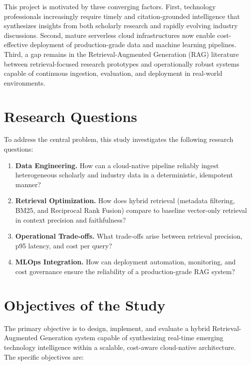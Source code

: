 This project is motivated by three converging factors. First, technology professionals increasingly require timely and citation-grounded intelligence that synthesizes insights from both scholarly research and rapidly evolving industry discussions. Second, mature serverless cloud infrastructures now enable cost-effective deployment of production-grade data and machine learning pipelines. Third, a gap remains in the Retrieval-Augmented Generation (RAG) literature between retrieval-focused research prototypes and operationally robust systems capable of continuous ingestion, evaluation, and deployment in real-world environments.

\section{Research Questions}
\label{sec:rq}

To address the central problem, this study investigates the following research questions:

\begin{enumerate}[leftmargin=0.5in]
  \item \textbf{Data Engineering.} How can a cloud-native pipeline reliably ingest heterogeneous scholarly and industry data in a deterministic, idempotent manner?

  \item \textbf{Retrieval Optimization.} How does hybrid retrieval (metadata filtering, BM25, and Reciprocal Rank Fusion) compare to baseline vector-only retrieval in context precision and faithfulness?

  \item \textbf{Operational Trade-offs.} What trade-offs arise between retrieval precision, p95 latency, and cost per query?

  \item \textbf{MLOps Integration.} How can deployment automation, monitoring, and cost governance ensure the reliability of a production-grade RAG system?
\end{enumerate}

\section{Objectives of the Study}
\label{sec:objectives}

The primary objective is to design, implement, and evaluate a hybrid Retrieval-Augmented Generation system capable of synthesizing real-time emerging technology intelligence within a scalable, cost-aware cloud-native architecture. The specific objectives are:

